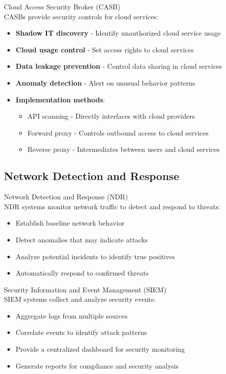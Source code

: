 \begin{concept}{Cloud Access Security Broker (CASB)}\\
CASBs provide security controls for cloud services:
\begin{itemize}
    \item \textbf{Shadow IT discovery} - Identify unauthorized cloud service usage
    \item \textbf{Cloud usage control} - Set access rights to cloud services
    \item \textbf{Data leakage prevention} - Control data sharing in cloud services
    \item \textbf{Anomaly detection} - Alert on unusual behavior patterns
    \item \textbf{Implementation methods}:
    \begin{itemize}
        \item API scanning - Directly interfaces with cloud providers
        \item Forward proxy - Controls outbound access to cloud services
        \item Reverse proxy - Intermediates between users and cloud services
    \end{itemize}
\end{itemize}
\end{concept}

\subsection{Network Detection and Response}

\begin{definition}{Network Detection and Response (NDR)}\\
NDR systems monitor network traffic to detect and respond to threats:
\begin{itemize}
    \item Establish baseline network behavior
    \item Detect anomalies that may indicate attacks
    \item Analyze potential incidents to identify true positives
    \item Automatically respond to confirmed threats
\end{itemize}
\end{definition}

\begin{concept}{Security Information and Event Management (SIEM)}\\
SIEM systems collect and analyze security events:
\begin{itemize}
    \item Aggregate logs from multiple sources
    \item Correlate events to identify attack patterns
    \item Provide a centralized dashboard for security monitoring
    \item Generate reports for compliance and security analysis
\end{itemize}
\end{concept}

